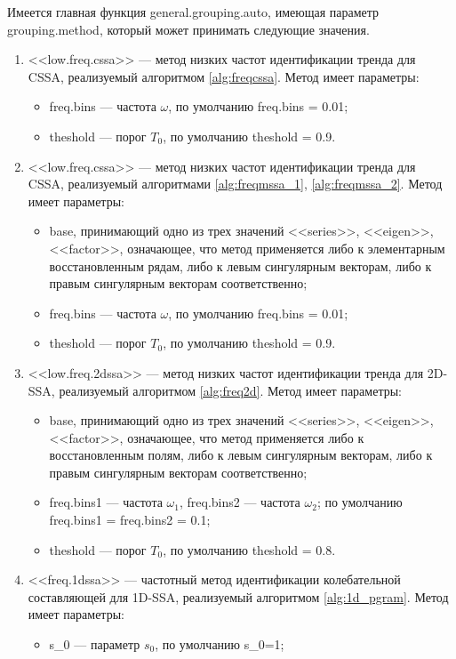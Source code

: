 \documentclass[specialist,
               substylefile = spbu.rtx,
               subf,href,colorlinks=true, 12pt]{disser}
\begin{document}
Имеется главная функция general.grouping.auto, имеющая параметр grouping.method, который может принимать следующие значения. 
\begin{enumerate}
\item <<low.freq.cssa>> --- метод низких частот идентификации тренда для CSSA, реализуемый алгоритмом \ref{alg:freqcssa}. Метод имеет параметры:
\begin{itemize}
\item freq.bins --- частота $\omega$, по умолчанию freq.bins = 0.01;
\item theshold --- порог $T_0$, по умолчанию theshold = 0.9.
\end{itemize}
\item <<low.freq.cssa>> --- метод низких частот идентификации тренда для CSSA, реализуемый алгоритмами \ref{alg:freqmssa_1}, \ref{alg:freqmssa_2}. Метод имеет параметры:
\begin{itemize}
\item base, принимающий одно из трех значений <<series>>, <<eigen>>, <<factor>>, означающее, что метод применяется либо к элементарным восстановленным рядам, либо к левым сингулярным векторам, либо к правым сингулярным векторам соответственно;
\item freq.bins --- частота $\omega$, по умолчанию freq.bins = 0.01;
\item theshold --- порог $T_0$, по умолчанию theshold = 0.9.
\end{itemize} 
\item <<low.freq.2dssa>> --- метод низких частот идентификации тренда для 2D-SSA, реализуемый алгоритмом \ref{alg:freq2d}. Метод имеет параметры:
\begin{itemize}
\item base, принимающий одно из трех значений <<series>>, <<eigen>>, <<factor>>, означающее, что метод применяется либо к восстановленным полям, либо к левым сингулярным векторам, либо к правым сингулярным векторам соответственно;
\item freq.bins1 --- частота $\omega_1$, freq.bins2 --- частота $\omega_2$; по умолчанию freq.bins1 = freq.bins2 = 0.1;
\item theshold --- порог $T_0$, по умолчанию theshold = 0.8.
\end{itemize} 
\item <<freq.1dssa>> --- частотный метод идентификации колебательной составляющей для 1D-SSA, реализуемый алгоритмом \ref{alg:1d_pgram}. Метод имеет параметры:
\begin{itemize}
\item s\_0 --- параметр $s_0$, по умолчанию s\_0=1;

\end{itemize}
\end{enumerate}
\end{document}

